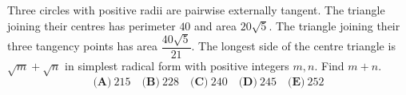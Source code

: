 Three circles with positive radii are pairwise externally tangent. The triangle joining their centres has perimeter $40$ and area $20\sqrt5$. The triangle joining their three tangency points has area $\dfrac{40\sqrt5}{21}$. The longest side of the centre triangle is $\sqrt m+\sqrt n$ in simplest radical form with positive integers $m,n$. Find $m+n$.
\[\textbf{(A)}~215\quad\textbf{(B)}~228\quad\textbf{(C)}~240\quad\textbf{(D)}~245\quad\textbf{(E)}~252\]
